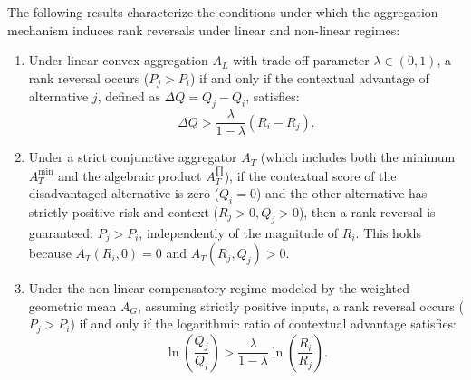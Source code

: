 \documentclass[mathematics,article,submit,moreauthors]{Definitions/mdpi}
\begin{document}
\begin{Proposition}
\label{prop:rank_reversal}
The following results characterize the conditions under which the aggregation mechanism induces rank reversals under linear and non-linear regimes:

\begin{enumerate}
\item Under linear convex aggregation $A_L$ with trade-off parameter $\lambda \in (0,1)$, a rank reversal occurs ($P_j > P_i$) if and only if the contextual advantage of alternative $j$, defined as $\Delta Q = Q_j - Q_i$, satisfies:
\begin{equation}
\Delta Q > \frac{\lambda}{1-\lambda}(R_i - R_j).
\end{equation}

\item Under a strict conjunctive aggregator $A_T$ (which includes both the minimum $A_T^{\min}$ and the algebraic product $A_T^{\prod}$), if the contextual score of the disadvantaged alternative is zero ($Q_i = 0$) and the other alternative has strictly positive risk and context ($R_j > 0, Q_j > 0$), then a rank reversal is guaranteed: $P_j > P_i$, independently of the magnitude of $R_i$. This holds because $A_T(R_i, 0) = 0$ and $A_T(R_j, Q_j) > 0$.

\item Under the non-linear compensatory regime modeled by the weighted geometric mean $A_G$, assuming strictly positive inputs, a rank reversal occurs ($P_j > P_i$) if and only if the logarithmic ratio of contextual advantage satisfies:
\begin{equation}
\ln\left(\frac{Q_j}{Q_i}\right) > \frac{\lambda}{1-\lambda} \ln\left(\frac{R_i}{R_j}\right).
\end{equation}
\end{enumerate}
\end{Proposition}
\end{document}

